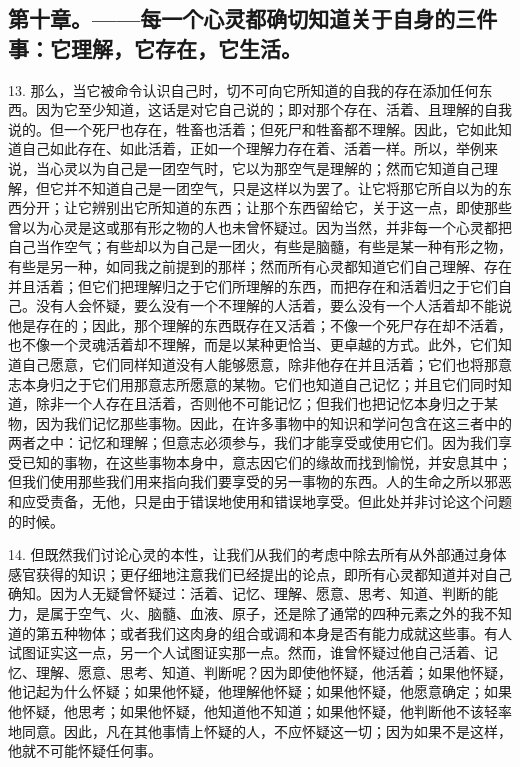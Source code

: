 
\subsection{第十章。——每一个心灵都确切知道关于自身的三件事：它理解，它存在，它生活。}

13. 那么，当它被命令认识自己时，切不可向它所知道的自我的存在添加任何东西。因为它至少知道，这话是对它自己说的；即对那个存在、活着、且理解的自我说的。但一个死尸也存在，牲畜也活着；但死尸和牲畜都不理解。因此，它如此知道自己如此存在、如此活着，正如一个理解力存在着、活着一样。所以，举例来说，当心灵以为自己是一团空气时，它以为那空气是理解的；然而它知道自己理解，但它并不知道自己是一团空气，只是这样以为罢了。让它将那它所自以为的东西分开；让它辨别出它所知道的东西；让那个东西留给它，关于这一点，即使那些曾以为心灵是这或那有形之物的人也未曾怀疑过。因为当然，并非每一个心灵都把自己当作空气；有些却以为自己是一团火，有些是脑髓，有些是某一种有形之物，有些是另一种，如同我之前提到的那样；然而所有心灵都知道它们自己理解、存在并且活着；但它们把理解归之于它们所理解的东西，而把存在和活着归之于它们自己。没有人会怀疑，要么没有一个不理解的人活着，要么没有一个人活着却不能说他是存在的；因此，那个理解的东西既存在又活着；不像一个死尸存在却不活着，也不像一个灵魂活着却不理解，而是以某种更恰当、更卓越的方式。此外，它们知道自己愿意，它们同样知道没有人能够愿意，除非他存在并且活着；它们也将那意志本身归之于它们用那意志所愿意的某物。它们也知道自己记忆；并且它们同时知道，除非一个人存在且活着，否则他不可能记忆；但我们也把记忆本身归之于某物，因为我们记忆那些事物。因此，在许多事物中的知识和学问包含在这三者中的两者之中：记忆和理解；但意志必须参与，我们才能享受或使用它们。因为我们享受已知的事物，在这些事物本身中，意志因它们的缘故而找到愉悦，并安息其中；但我们使用那些我们用来指向我们要享受的另一事物的东西。人的生命之所以邪恶和应受责备，无他，只是由于错误地使用和错误地享受。但此处并非讨论这个问题的时候。\par

14. 但既然我们讨论心灵的本性，让我们从我们的考虑中除去所有从外部通过身体感官获得的知识；更仔细地注意我们已经提出的论点，即所有心灵都知道并对自己确知。因为人无疑曾怀疑过：活着、记忆、理解、愿意、思考、知道、判断的能力，是属于空气、火、脑髓、血液、原子，还是除了通常的四种元素之外的我不知道的第五种物体；或者我们这肉身的组合或调和本身是否有能力成就这些事。有人试图证实这一点，另一个人试图证实那一点。然而，谁曾怀疑过他自己活着、记忆、理解、愿意、思考、知道、判断呢？因为即使他怀疑，他活着；如果他怀疑，他记起为什么怀疑；如果他怀疑，他理解他怀疑；如果他怀疑，他愿意确定；如果他怀疑，他思考；如果他怀疑，他知道他不知道；如果他怀疑，他判断他不该轻率地同意。因此，凡在其他事情上怀疑的人，不应怀疑这一切；因为如果不是这样，他就不可能怀疑任何事。\par

